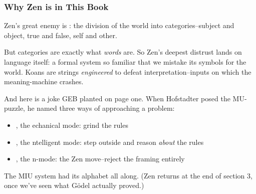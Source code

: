 \documentclass[aspectratio=169]{beamer}
\newcommand{\tm}[1]{\text{\color{textColor}\texttt{#1}}}
\begin{document}
\begin{frame}[fragile]
  \frametitle{Why Zen is in This Book}

  Zen's great enemy is : the division of the world into
  categories--subject and object, true and false, self and other.

  \pause
  \vspace{\fill}

  But categories are exactly what \textit{words} are. So Zen's
  deepest distrust lands on language itself: a formal system so
  familiar that we mistake its symbols for the world. Koans are
  strings \textit{engineered} to defeat interpretation--inputs on
  which the meaning-machine crashes.

  \pause
  \vspace{\fill}

  And here is a joke GEB planted on page one. When Hofstadter posed
  the MU-puzzle, he named three ways of approaching a problem:

  \begin{itemize}
    \item {}, the \tm{M}echanical mode: grind the rules
    \item {}, the \tm{I}ntelligent mode: step outside and
      reason \textit{about} the rules
    \item {}, the \tm{U}n-mode: the Zen move--reject the
      framing entirely
  \end{itemize}

  \pause

  The MIU system had its alphabet all along. (Zen returns at the end
  of section 3, once we've seen what G\"odel actually proved.)
\end{frame}

\end{document}
